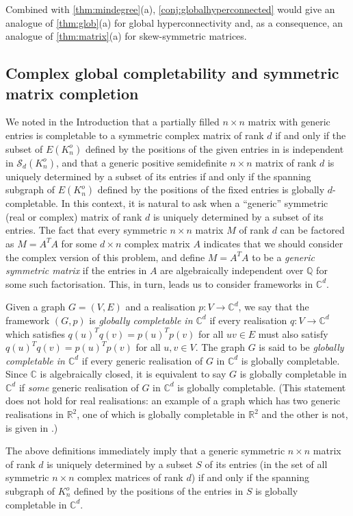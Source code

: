 \documentclass[11pt,a4paper,dvipsnames]{scrartcl}
\newcommand{\real}{{\mathbb{R}}}
\newcommand{\complex}{{\mathbb{C}}}
\newcommand{\rat}{{\mathbb{Q}}}
\newcommand{\cS}{{\mathcal{S}}}
\begin{document}
Combined with \cref{thm:mindegree}(a), \cref{conj:globalhyperconnected} would give an analogue of \cref{thm:glob}(a) for global hyperconnectivity and, as a consequence, an analogue of \cref{thm:matrix}(a) for skew-symmetric matrices.

\subsection{Complex global completability  and symmetric matrix completion}\label{sec:complex}
We noted in the Introduction that a partially filled $n\times n$ matrix  with generic entries is completable to a symmetric complex matrix of rank $d$ if and only if the subset of $E(K_n^o)$ defined by the positions of the given entries in is independent in $\cS_d(K_n^o)$, and that a generic positive semidefinite   $n\times n$ matrix of rank $d$ is uniquely determined by a subset of its entries if and only if the spanning subgraph of $E(K_n^o)$ defined by the positions of the fixed entries is globally $d$-completable. In this context, it is natural to ask when a ``generic'' symmetric (real or complex) matrix of rank $d$ is uniquely determined by a subset of its entries. The fact that every symmetric  $n\times n$ matrix $M$ of rank $d$ can be factored as $M=A^TA$ for some $d\times n$ complex matrix $A$ indicates that we should consider the complex version of this problem, and define  $M=A^TA$ to be a {\em generic symmetric matrix} if the entries in $A$ are algebraically independent over $\rat$ for some such factorisation. This, in turn, leads us to consider frameworks in $\complex^d$. 

Given a graph $G=(V,E)$ and a realisation $p:V\to \complex^d$, we say that the framework $(G,p)$
 is {\em globally completable in $\complex^d$} if every realisation  $q:V\to  \complex^d$ which satisfies $q(u)^Tq(v)=p(u)^Tp(v)$ for all $uv\in E$ must also satisfy $q(u)^Tq(v)=p(u)^Tp(v)$ for all $u,v\in V$. The graph $G$ is said to be {\em globally completable in $\complex^d$} if every generic realisation of $G$ in $\complex^d$ is globally completable.
Since $\complex$ is algebraically closed, it is equivalent to say $G$ is {globally completable in $\complex^d$} if {\em some} generic realisation of $G$ in $\complex^d$ is globally completable.
(This statement does not hold for real realisations: an example of a graph which has two generic realisations in $\real^2$, one of which is globally completable   in $\real^2$ and the other is not, is given in \cite{JJT2}.)

The above definitions immediately imply that a generic symmetric $n\times n$ matrix of rank $d$ is uniquely determined by a subset $S$ of its  entries (in the set of all  symmetric $n\times n$ complex matrices of rank $d$) if and only if the spanning subgraph of $K_n^o$ defined by the positions of the entries in $S$ is globally completable in $\complex^d$.
\end{document}
